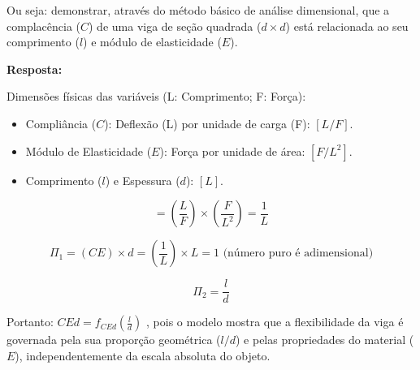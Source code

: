 Ou seja: demonstrar, através do método básico de análise dimensional, que a complacência ($C$) de uma viga de seção quadrada ($d \times d$) está relacionada ao seu comprimento ($l$) e módulo de elasticidade ($E$).

\textbf{{Resposta:}}

Dimensões físicas das variáveis  ({L}: Comprimento; {F}: Força):
\begin{itemize}
    \item {Compliância ($C$):} Deflexão (L) por unidade de carga (F): $[L/F]$.
    \item {Módulo de Elasticidade ($E$):} Força por unidade de área: $[F/L^2]$.
    \item {Comprimento ($l$) e Espessura ($d$):}  $[L]$.
\end{itemize}


\begin{equation*}
[C \times E] = \left( \frac{L}{F} \right) \times \left( \frac{F}{L^2} \right) = \frac{1}{L}
\end{equation*}

\begin{equation*}
\Pi_1 = (CE) \times d = \left( \frac{1}{L} \right) \times L = 1 \text{ (número puro é adimensional)}
\end{equation*}

\begin{equation*}
\Pi_2 = \frac{l}{d}
\end{equation*}

Portanto: 
$CEd = f_{CEd}\left(\frac{l}{d} \right)$
, pois o modelo mostra que a flexibilidade da viga é governada pela sua {proporção geométrica} ($l/d$) e pelas {propriedades do material} ($E$), independentemente da escala absoluta do objeto.
